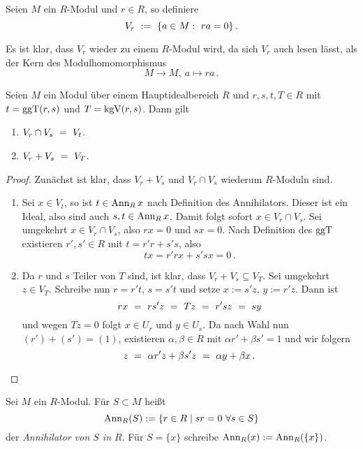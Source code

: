 \begin{definition}
  \label{def:V_r}
  Seien $M$ ein $R$-Modul und $r \in R$, so definiere
  \[ V_r \ :=\  \{ a\in M:\ ra = 0\}\,.\]
\end{definition}


\begin{bemerkung}
  Es ist klar, dass $V_r$ wieder zu einem $R$-Modul wird, da sich $V_r$ auch
  lesen lässt, als der Kern des Modulhomomorphismus
  \[ M\to M,\ a \mapsto ra\,.\]
\end{bemerkung}

\begin{satz}
  \label{satz:schnitt_plus_vs}
  Seien $M$ ein Modul über einem Hauptidealbereich $R$ und $r,s,t,T\in R$ mit 
  $t = \operatorname{ggT}(r,s)$ und $T = \operatorname{kgV}(r,s)$. Dann gilt
  \begin{enumerate}
    \item $V_r \cap V_s \ =\  V_t$.
    \item $V_r + V_s \ =\  V_T$.
  \end{enumerate}
\end{satz}
\begin{proof}
  Zunächst ist klar, dass $V_r+V_s$ und $V_r\cap V_s$ wiederum $R$-Moduln sind.
  \begin{enumerate}
    \item Sei $x\in V_t$, so ist $t \in \operatorname{Ann}_Rx$ nach Definition des
      Annihilators. Dieser ist ein Ideal, also sind auch $s,t\in \operatorname{Ann}_Rx$.
      Damit folgt sofort $x \in V_r\cap V_s$.
      Sei umgekehrt $x \in V_r \cap V_s$, also $rx = 0$ und $sx = 0$. 
      Nach Definition des $\operatorname{ggT}$ existieren $r',s'\in R$ mit 
      $t = r'r + s's$, also 
      \[ tx = r'rx + s'sx = 0\,.\]
    \item Da $r$ und $s$ Teiler von $T$ sind, ist klar, dass
      $V_r+V_s \subseteq V_T$. Sei umgekehrt $z\in V_T$.
      Schreibe nun $r = r't$, $s = s't$ und setze
      $x := s'z$, $y:=r'z$. Dann ist 
      \[ rx \ =\  rs'z \ =\  Tz \ =\  r'sz \ =\  sy \]
      und wegen $Tz = 0$ folgt $x\in U_r$ und $y \in U_s$. Da nach Wahl nun
      $(r')+(s') = (1)$, existieren $\alpha,\beta\in R$ mit 
      $\alpha r' + \beta s' = 1$ und wir folgern
      \[ z \ =\  \alpha r'z + \beta s'z \ =\  \alpha y + \beta x \,.\]
  \end{enumerate}
\end{proof}

\begin{definition}[Annihilator]
  Sei $M$ ein $R$-Modul. Für $S\subset M$ heißt
  \[ \Ann_R(S) := \{ r \in R \mid sr = 0\ \forall s\in S\}\]
  der \emph{Annihilator von $S$ in $R$}. 
  Für $S= \{x\}$ schreibe $\operatorname{Ann}_R(x) := \operatorname{Ann}_R(\{x\})$.
\end{definition}

